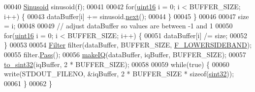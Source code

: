 \begin{DoxyCode}
00040         \hyperlink{classradio_1_1Sinusoid}{Sinusoid} sinusoid(f);
00041 
00042         \textcolor{keywordflow}{for}(\hyperlink{definitions_8hpp_a05f6b0ae8f6a6e135b0e290c25fe0e4e}{uint16} i = 0; i < BUFFER\_SIZE; i++) \{
00043             dataBuffer[i] += sinusoid.\hyperlink{classradio_1_1Sinusoid_aab44298ea1bd5cb175d5826243cf56f2}{next}();
00044         \}
00045     \}
00046 
00047     size = i;
00048     
00049     \textcolor{comment}{// adjust dataBuffer so values are between -1 and 1}
00050     \textcolor{keywordflow}{for}(\hyperlink{definitions_8hpp_a05f6b0ae8f6a6e135b0e290c25fe0e4e}{uint16} i = 0; i < BUFFER\_SIZE; i++) \{
00051         dataBuffer[i] /= size;
00052     \}
00053     
00054     \hyperlink{classradio_1_1Filter}{Filter} filter(dataBuffer, BUFFER\_SIZE, \hyperlink{namespaceradio_a0ffd57d5a11ff70a1f55dbdc8ebe098d}{F\_LOWERSIDEBAND});
00055     filter.\hyperlink{classradio_1_1Filter_ad2793821801780809af385463bf8f197}{Pass}();
00056     \hyperlink{namespaceradio_a7166522e76ff88e8d482491b1b6e2275}{makeIQ}(dataBuffer, iqBuffer, BUFFER\_SIZE);
00057     \hyperlink{namespaceradio_ae4b2334c4366dcdf0311ad79d2067945}{to\_sint32}(iqBuffer, 2 * BUFFER\_SIZE);
00058 
00059     \textcolor{keywordflow}{while}(\textcolor{keyword}{true}) \{
00060         write(STDOUT\_FILENO, &iqBuffer, 2 * BUFFER\_SIZE * \textcolor{keyword}{sizeof}(\hyperlink{definitions_8hpp_a0573de65958b4fda3a0460ed417dafb8}{sint32}));
00061     \}
00062 \}
\end{DoxyCode}
